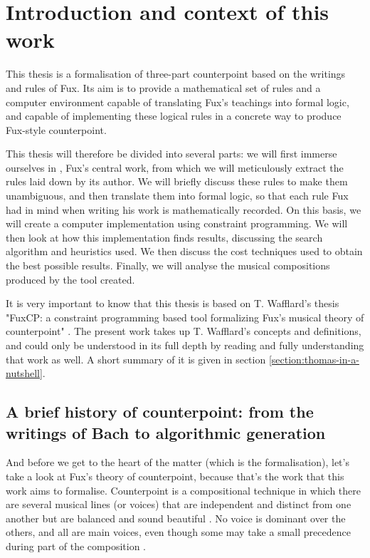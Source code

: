 \chapter{Introduction and context of this work}
This thesis is a formalisation of three-part counterpoint based on the writings and rules of Fux. Its aim is to provide a mathematical set of rules and a computer environment capable of translating Fux's teachings into formal logic, and capable of implementing these logical rules in a concrete way to produce Fux-style counterpoint.


This thesis will therefore be divided into several parts: we will first immerse ourselves in \gap, Fux's central work, from which we will meticulously extract the rules laid down by its author. We will briefly discuss these rules to make them unambiguous, and then translate them into formal logic, so that each rule Fux had in mind when writing his work is mathematically recorded. On this basis, we will create a computer implementation using constraint programming. We will then look at how this implementation finds results, discussing the search algorithm and heuristics used. We then discuss the cost techniques used to obtain the best possible results. Finally, we will analyse the musical compositions produced by the tool created.

It is very important to know that this thesis is based on T. Wafflard's thesis "FuxCP: a constraint programming based tool formalizing Fux's musical theory of counterpoint" \cite{wafflard2023}. The present work takes up T. Wafflard's concepts and definitions, and could only be understood in its full depth by reading and fully understanding that work as well. A short summary of it is given in section \ref{section:thomas-in-a-nutshell}.



\section{A brief history of counterpoint: from the writings of Bach to algorithmic generation}
And before we get to the heart of the matter (which is the formalisation), let's take a look at Fux's theory of counterpoint, because that's the work that this work aims to formalise. Counterpoint is a compositional technique in which there are several musical lines (or voices) that are independent and distinct from one another but are balanced and sound beautiful \cite{CpSachs}. No voice is dominant over the others, and all are main voices, even though some may take a small precedence during part of the composition \cite{hess2016}.  


